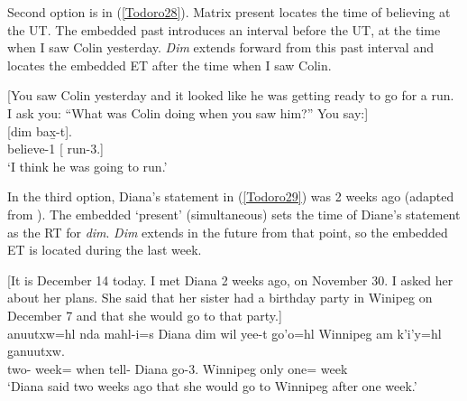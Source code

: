 \documentclass[output=paper]{langscibook}
\begin{document}
Second option is in (\ref{Todoro28}). Matrix present locates the time of believing at the UT. The embedded past introduces an interval before the UT, at the time when I saw Colin yesterday. \emph{Dim} extends forward from this past interval and locates the embedded ET after the time when I saw Colin.

\begin{exe}
\ex \label{Todoro28}
\begin{xlist}

\ex \label{Todoro28a} [You saw Colin yesterday and it looked like he was getting ready 
     to go for a run. I ask you: ``What was Colin doing when you saw him?'' You say:]\\
 	[{dim}	{bax̱-t}].  \\
    believe-1	[	run-3.{\seriesII}] \\
\glt ‘I think he was going to run.’ 

\ex \label{Todoro28b}

\end{xlist}
\end{exe}

In the third option, Diana’s statement in (\ref{Todoro29}) was 2 weeks ago (adapted from \citealt{johannsdottirmatthewson2007a}). The embedded ‘present’ (simultaneous) sets the time of Diane’s statement as the RT for \emph{dim}. \emph{Dim} extends in the future from that point, so the embedded ET is located during the last week.

\begin{exe}
\ex \label{Todoro29}
\begin{xlist}

\ex \label{Todoro29a} [It is December 14 today. I met Diana 2 weeks ago, on 
November 30. I asked her about her plans. She said that her sister had a birthday party in Winipeg on December 7 and that she would go to that party.]\\
 {anuutxw=hl}	{nda}          {mahl-i=s} {Diana}    {dim}      {wil} {yee-t}	{g̱o’o=hl} {Winnipeg} {am} {k’i’y=hl}	{g̱anuutxw}. \\
    two- week={\cn} 	when 	     tell- Diana	       go-3.{\seriesII}          Winnipeg	only one=	week\\
\glt ‘Diana said two weeks ago that she would go to Winnipeg after 	 one week.’ 

\ex \label{Todoro29b}

\end{xlist}
\end{exe}
\end{document}
